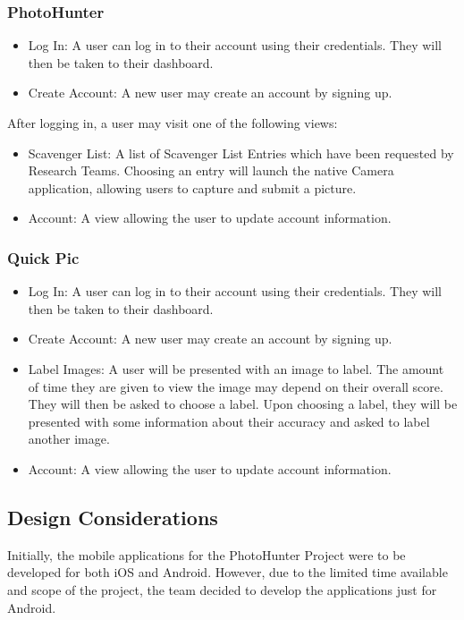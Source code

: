 \documentclass{article}
\begin{document}
\subsubsection{PhotoHunter}

\begin{itemize}
  \item Log In: A user can log in to their account using their credentials.
        They will then be taken to their dashboard.
  \item Create Account: A new user may create an account by signing up.
\end{itemize}

After logging in, a user may visit one of the following views:

\begin{itemize}
  \item Scavenger List: A list of Scavenger List Entries which have been
        requested by Research Teams. Choosing an entry will launch the native Camera
        application, allowing users to capture and submit a picture.
  \item Account: A view allowing the user to update account information.
\end{itemize}

\subsubsection{Quick Pic}

\begin{itemize}
  \item Log In: A user can log in to their account using their credentials. They will then be taken to their dashboard.
  \item Create Account: A new user may create an account by signing up.
\end{itemize}

\begin{itemize}
  \item Label Images: A user will be presented with an image to label.  The
    amount of time they are given to view the image may depend on their overall
    score.  They will then be asked to choose a label.  Upon choosing a label,
    they will be presented with some information about their accuracy and asked
    to label another image.
  \item Account: A view allowing the user to update account information.
\end{itemize}
\subsection{Design Considerations}
Initially, the mobile applications for the PhotoHunter Project were to be
developed for both iOS and Android. However, due to the limited time available
and scope of the project, the team decided to develop the applications just for
Android.
\end{document}
